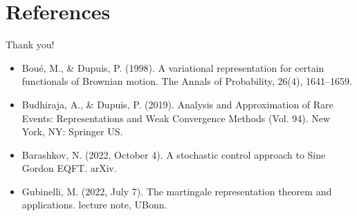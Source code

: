 \documentclass{if-beamer}
\begin{document}
\section{References}
\begin{frame}
    \begin{center}
        \Huge Thank you!
    \end{center}
    \vfill
    \begin{itemize}
        \item Boué, M., \& Dupuis, P. (1998). A variational representation for certain functionals of Brownian motion. The Annals of Probability, 26(4), 1641–1659. 
        \item 
        Budhiraja, A., \& Dupuis, P. (2019). Analysis and Approximation of Rare Events: Representations and Weak Convergence Methods (Vol. 94). New York, NY: Springer US. 
        \item Barashkov, N. (2022, October 4). A stochastic control approach to Sine Gordon EQFT. arXiv. 
        \item Gubinelli, M. (2022, July 7). The martingale representation theorem and applications. lecture note, UBonn. 
    \end{itemize}
\end{frame}
\end{document}
